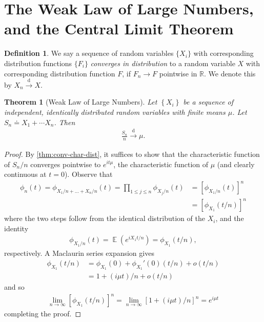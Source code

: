 \documentclass[12pt]{amsbook}
\newcommand{\rr}{\mathbb{R}}
\DeclareMathOperator{\ex}{\mathbb{E}}
\theoremstyle{plain}
\newtheorem{theorem}{Theorem}
\theoremstyle{definition}
\newtheorem*{definition}{Definition}
\theoremstyle{remark}
\numberwithin{equation}{section}  %
\begin{document}
	\section{The Weak Law of Large Numbers, and the Central Limit Theorem}
	\begin{definition}
		We say a sequence of random variables $\{X_{i}\}$
		with corresponding distribution functions $\{F_{i}\}$
		\emph{converges in distribution} to a random variable $X$ with corresponding
		distribution function $F$, if $F_{n} \to F$ pointwise in $\rr$.
		We denote this by $X_{n} \xrightarrow{\text{d}} X$.
	\end{definition}
	\begin{theorem}[Weak Law of Large Numbers]\label{thm:weak-law}
		Let $\left\{ X_{i} \right\}$ be a sequence of independent, identically
		distributed random variables with finite means $\mu$. Let
		$S_{n} \doteq X_{1} + \cdots X_{n}$. Then
		\begin{equation*}
			\begin{split}
				\frac{S_{n}}{n} \xrightarrow{\text{d}} \mu.
			\end{split}
		\end{equation*}
	\end{theorem}
	\begin{proof}
		By \cref{thm:conv-char-dist}, it suffices to show that
		the characteristic function of $S_{n}/n$ converges
		pointwise to  $e^{it \mu}$, the characteristic function of $\mu$ (and clearly
		continuous at $t=0$). Observe that
		\begin{equation*}
			\begin{split}
				\phi_{n}(t) = \phi_{X_{1}/n + \ldots + X_{n}/n}(t)
				= \prod_{1 \le j \le n} \phi_{X_{j}/n}(t)
				& = \left[ \phi_{X_{1}/n}(t) \right]^{n}
				\\
				& = \left[ \phi_{X_{1}}(t/n) \right]^{n}
			\end{split}
		\end{equation*}
		where the two steps follow from the identical distribution of the $X_{i}$,
		and the identity
		\begin{equation*}
			\begin{split}
				\phi_{X_{1}/n}(t) = \ex(e^{i X_{1} t /n}) = \phi_{X_{1}}(t/n),
			\end{split}
		\end{equation*}
		respectively. A Maclaurin series expansion gives
		\begin{equation*}
			\begin{split}
				\phi_{X_{1}}(t/n) & = \phi_{X_{1}}(0) + \phi_{X_{1}}'(0)(t/n) + o(t/n)
				\\
				& = 1 + (i \mu t)/n + o(t/n)
			\end{split}
		\end{equation*}
		and so
		\begin{equation*}
			\begin{split}
				\lim_{n \to \infty} \left[ \phi_{X_{1}}(t/n) \right]^{n}
				= \lim_{n \to \infty} \left[ 1 + (i \mu t)/n \right]^{n} = e^{i \mu t}
			\end{split}
		\end{equation*}
		completing the proof.
	\end{proof}
\end{document}
